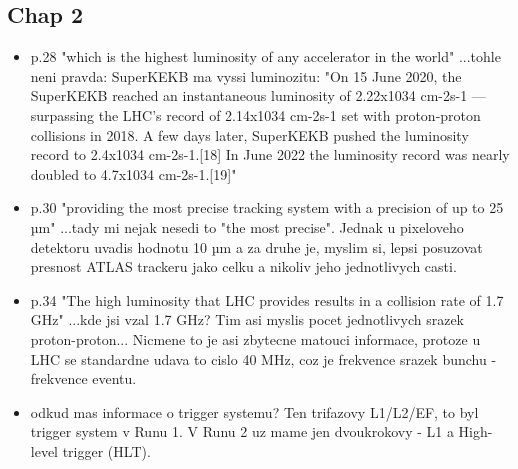\subsection{Chap 2}
\begin{itemize} 
\item p.28 "which is the highest luminosity of any accelerator in the world" 
...tohle neni pravda: SuperKEKB ma vyssi luminozitu: "On 15 June 2020, 
the SuperKEKB reached an instantaneous luminosity of 2.22x1034 cm-2s-1 — 
surpassing the LHC's record of 2.14x1034 cm-2s-1 set with proton-proton 
collisions in 2018. A few days later, SuperKEKB pushed the luminosity 
record to 2.4x1034 cm-2s-1.[18] In June 2022 the luminosity record was 
nearly doubled to 4.7x1034 cm-2s-1.[19]"
\item p.30 "providing the most precise tracking system with a precision of 
up to 25 µm" ...tady mi nejak nesedi to "the most precise". Jednak u 
pixeloveho detektoru uvadis hodnotu 10 µm a za druhe je, myslim si, 
lepsi posuzovat presnost ATLAS trackeru jako celku a nikoliv jeho 
jednotlivych casti.
\item p.34 "The high luminosity that LHC provides results in a collision 
rate of 1.7 GHz" ...kde jsi vzal 1.7 GHz? Tim asi myslis pocet 
jednotlivych srazek proton-proton... Nicmene to je asi zbytecne matouci 
informace, protoze u LHC se standardne udava to cislo 40 MHz, coz je 
frekvence srazek bunchu - frekvence eventu.
\item odkud mas informace o trigger systemu? Ten trifazovy L1/L2/EF, to byl 
trigger system v Runu 1. V Runu 2 uz mame jen dvoukrokovy - L1 a 
High-level trigger (HLT).
\end{itemize}

